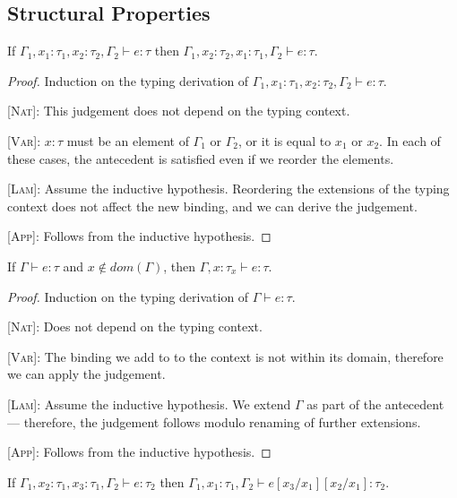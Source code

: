 \documentclass[nonacm]{acmart}
\begin{document}
\subsection{Structural Properties}

\begin{lemma}[Exchange]
  If \(\Gamma_1 , x_1 : \tau_1 , x_2 : \tau_2 , \Gamma_2 \vdash e : \tau　\) then \(
  \Gamma_1 , x_2 : \tau_2 , x_1 : \tau_1 , \Gamma_2 \vdash e : \tau \).
\end{lemma}

\begin{proof}
  Induction on the typing derivation of \(\Gamma_1 , x_1 : \tau_1 , x_2 : \tau_2 , \Gamma_2 \vdash e : \tau \).

  \textsc{[Nat]}: This judgement does not depend on the typing context.

  \textsc{[Var]}: \(x : \tau \) must be an element of \(\Gamma_1\) or \(\Gamma_2\),
  or it is equal to \(x_1\) or \(x_2\). In each of these cases, the antecedent
  is satisfied even if we reorder the elements.

  \textsc{[Lam]}: Assume the inductive hypothesis. Reordering the extensions of
  the typing context does not affect the new binding, and we can derive the judgement.

  \textsc{[App]}: Follows from the inductive hypothesis.
\end{proof}

\begin{lemma}[Weakening]
  If \(\Gamma \vdash e : \tau \) and \( x \notin dom(\Gamma)\), then \(\Gamma, x : \tau_x \vdash e : \tau \).
\end{lemma}

\begin{proof}
  Induction on the typing derivation of \(\Gamma \vdash e : \tau \).

  \textsc{[Nat]}: Does not depend on the typing context.

  \textsc{[Var]}: The binding we add to to the context is not within its domain,
  therefore we can apply the judgement.

  \textsc{[Lam]}: Assume the inductive hypothesis. We extend \(\Gamma\) as part
  of the antecedent --- therefore, the judgement follows modulo renaming of further
  extensions.

  \textsc{[App]}: Follows from the inductive hypothesis.
\end{proof}

\begin{lemma}[Contraction]
  If \(\Gamma_1, x_2 : \tau_1, x_3 : \tau_1, \Gamma_2 \vdash e : \tau_2 \) then \(\Gamma_1, x_1 : \tau_1, \Gamma_2 \vdash e[x_3/x_1][x_2/x_1] : \tau_2 \).
\end{lemma}
\end{document}
